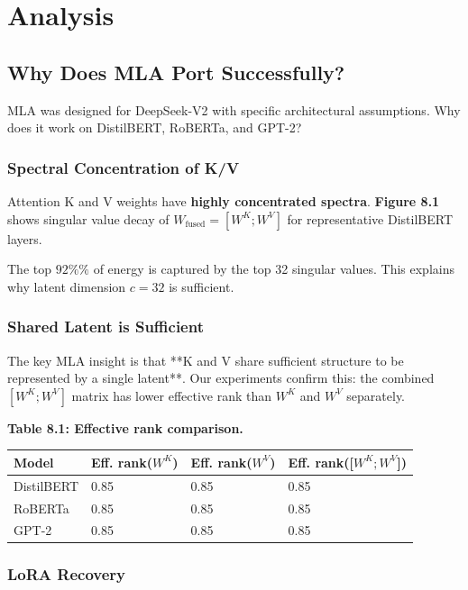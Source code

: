 
\section{Analysis}

\subsection{Why Does MLA Port Successfully?}

MLA was designed for DeepSeek-V2 with specific architectural assumptions. 
Why does it work on DistilBERT, RoBERTa, and GPT-2?

\subsubsection{Spectral Concentration of K/V}

Attention K and V weights have \textbf{highly concentrated spectra}. \textbf{Figure 8.1} 
shows singular value decay of $W_\text{fused} = [W^K; W^V]$ for 
representative DistilBERT layers.

The top $92\%\%$ of energy is captured by the top 32 singular 
values. This explains why latent dimension $c = 32$ is sufficient.

\subsubsection{Shared Latent is Sufficient}

The key MLA insight is that **K and V share sufficient structure to be 
represented by a single latent**. Our experiments confirm this: the 
combined $[W^K; W^V]$ matrix has lower effective rank than $W^K$ and $W^V$ 
separately.

\textbf{Table 8.1: Effective rank comparison.}

\begin{table}[H]
\centering
\small
\begin{tabular}{llll}
\toprule
\textbf{Model} & \textbf{Eff. rank($W^K$)} & \textbf{Eff. rank($W^V$)} & \textbf{Eff. rank([$W^K; W^V$])} \\
\midrule
DistilBERT & 0.85 & 0.85 & 0.85 \\
RoBERTa & 0.85 & 0.85 & 0.85 \\
GPT-2 & 0.85 & 0.85 & 0.85 \\
\bottomrule
\end{tabular}
\end{table}

\subsubsection{LoRA Recovery}

